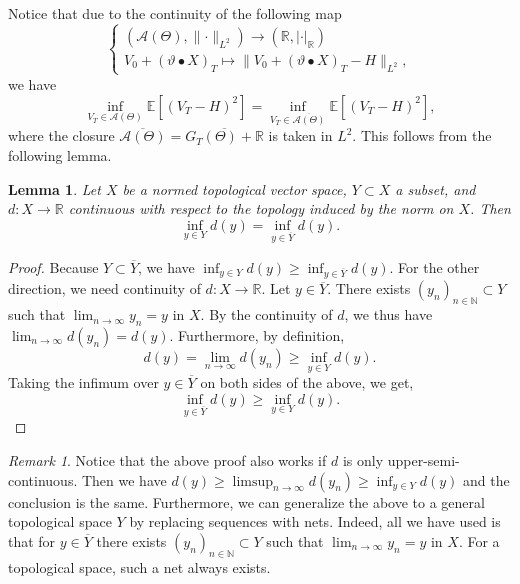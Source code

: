 \documentclass[11pt,a4paper,twoside,openany]{report}
\theoremstyle{plain} %
\newtheorem{lemma}[lemma]{Lemma}
\theoremstyle{definition} %
\theoremstyle{remark} %
\newtheorem{remark}[remark]{Remark}
\begin{document}
Notice that due to the continuity of the following map
\begin{equation}
\begin{cases}
    (\mathcal{A}(\Theta),\lVert\cdot\rVert_{L^2})\to(\mathbb{R},|\cdot|_{\mathbb{R}})\\
    V_0+(\vartheta\bullet X)_T\mapsto\lVert V_0+(\vartheta\bullet X)_T-H\rVert_{L^2},
\end{cases}
\end{equation}
we have 
\begin{equation}\label{eq:mean squared hedging over closure}
\inf_{V_T\in\mathcal{A}(\Theta)}\mathbb{E}[\left(V_T-H\right)^2]=\inf_{V_T\in \overline{\mathcal{A}(\Theta)}}\mathbb{E}[\left(V_T-H\right)^2],
\end{equation}
where the closure \(\overline{\mathcal{A}(\Theta)}=\overline{G_T(\Theta)+\mathbb{R}}\) is taken in \(L^2\). 
This follows from the following lemma.
\begin{lemma}\label{lemma:minimization of closure}
     Let \(X\) be a normed topological vector space, \(Y\subset X\) a subset, and \(d:X\to\mathbb{R}\) continuous with respect to the topology induced by the norm on \(X\). Then 
     \begin{equation}
         \inf_{y\in Y} d(y)=\inf_{y\in\overline{Y}} d(y).
     \end{equation}
\end{lemma}
\begin{proof}
 Because \(Y\subset\overline{Y}\), we have \(\inf_{y\in Y} d(y)\geq\inf_{y\in\overline{Y}} d(y)\). For the other direction, we need continuity of \(d:X\to\mathbb{R}\). Let \(y\in\overline{Y}\). There exists \((y_n)_{n\in\mathbb{N}}\subset Y\) such that \(\lim_{n\to\infty}y_n = y\) in \(X\). By the continuity of \(d\), we thus have \(\lim_{n\to\infty}d(y_n) = d(y)\). Furthermore, by definition,
    \begin{equation}
        d(y)=\lim_{n\to\infty}d(y_n)\geq\inf_{y\in Y} d(y).
    \end{equation}
    Taking the infimum over \(y\in\overline{Y}\) on both sides of the above, we get,
    \begin{equation}
        \inf_{y\in\overline{Y}} d(y) \geq \inf_{y\in Y} d(y).
    \end{equation}
\end{proof}
\begin{remark}
   Notice that the above proof also works if \(d\) is only upper-semi-continuous. Then we have \(d(y)\geq\limsup_{n\to\infty}{d(y_n)}\geq\inf_{y\in Y}d(y)\) and the conclusion is the same. Furthermore, we can generalize the above to a general topological space \(Y\) by replacing sequences with nets. Indeed, all we have used is that for \(y\in\overline{Y}\) there exists \((y_n)_{n\in\mathbb{N}}\subset Y\) such that \(\lim_{n\to\infty}y_n = y\) in \(X\). For a topological space, such a net always exists.
\end{remark}
\end{document}
